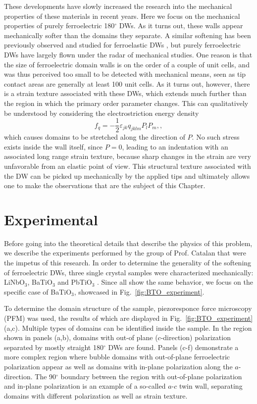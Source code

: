 These developments have slowly increased the research into the mechanical properties of these materials in recent years.
Here we focus on the mechanical properties of purely ferroelectric 180$^\circ$ DWs.
As it turns out, these walls appear mechanically softer than the domains they separate.
A similar softening has been previously observed and studied for ferroelastic DWs \cite{Lee2003,Scott2012}, but purely ferroelectric DWs have largely flown under the radar of mechanical studies.
One reason is that the size of ferroelectric domain walls is on the order of a couple of unit cells, and was thus perceived too small to be detected with mechanical means, seen as tip contact areas are generally at least 100 unit cells.
As it turns out, however, there is a strain texture associated with these DWs, which extends much further than the region in which the primary order parameter changes.
This can qualitatively be understood by considering the electrostriction energy density
\begin{equation}
f_{q}=-\frac{1}{2}\varepsilon_{jk}q_{jklm}P_{l}P_{m},\label{eq:qpp},
\end{equation}
which causes domains to be stretched along the direction of $P$.
No such stress exists inside the wall itself, since $P=0$, leading to an indentation with an associated long range strain texture, because sharp changes in the strain are very unfavorable from an elastic point of view.
This structural texture associated with the DW can be picked up mechanically by the applied tips and ultimately allows one to make the observations that are the subject of this Chapter.

\section{Experimental}
Before going into the theoretical details that describe the physics of this problem, we describe the experiments performed by the group of Prof. Catalan that were the impetus of this research.
In order to determine the generality of the softening of ferroelectric DWs, three single crystal samples were characterized mechanically: LiNbO$_3$, BaTiO$_3$ and PbTiO$_3$ \cite{Stefani2020}. Since all show the same behavior, we focus on the specific case of BaTiO$_3$, showcased in Fig.~\ref{fig:BTO_experiment}.

To determine the domain structure of the sample, piezoresponce force microscopy (PFM)\cite{Harnagea2001} was used, the results of which are displayed in Fig.~\ref{fig:BTO_experiment}(a,c).
Multiple types of domains can be identified inside the sample.
In the region shown in panels (a,b), domains with out-of plane ($c$-direction) polarization separated by mostly straight 180$^\circ$ DWs are found.
Panels (c-f) demonstrate a more complex region where bubble domains with out-of-plane ferroelectric polarization appear as well as domains with in-plane polarization along the $a$-direction.
The 90$^\circ$ boundary between the region with out-of-plane polarization and in-plane polarization is an example of a so-called $a$-$c$ twin wall, separating domains with different polarization as well as strain texture.

